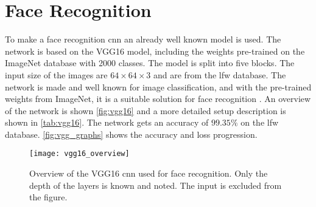 \section{Face Recognition}
To make a face recognition \gls{cnn} an already well known model is used. The network is based on the VGG16 model, including the weights pre-trained on the ImageNet database with 2000 classes. The model is split into five blocks. The input size of the images are $64\times64\times3$ and are from the \gls{lfw} database. The network is made and well known for image classification, and with the pre-trained weights from ImageNet, it is a suitable solution for face recognition \citep{Simonyan2015}.
An overview of the network is shown \autoref{fig:vgg16} and a more detailed setup description is shown in \autoref{tab:vgg16}. The network gets an accuracy of $99.35\%$ on the \gls{lfw} database. \autoref{fig:vgg_graphs} shows the accuracy and loss progression.

\begin{figure}[H]
	\centering
	\texttt{[image: vgg16\_overview]}
	\caption{Overview of the VGG16 \gls{cnn} used for face recognition. Only the depth of the layers is known and noted. The input is excluded from the figure.}
	\label{fig:vgg16}
\end{figure}

